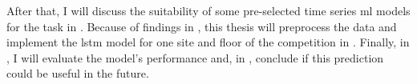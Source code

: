 After that, I will discuss the suitability of some pre-selected time series \ac{ml} models for the task in . 
Because of findings in , this thesis will preprocess the data and implement the \ac{lstm} model for one site and floor of the competition in .
Finally, in , I will evaluate the model's performance and, in , conclude if this prediction could be useful in the future.

